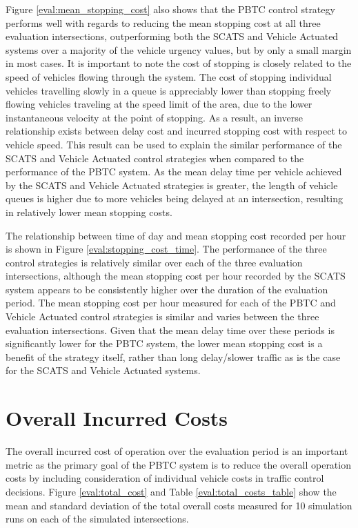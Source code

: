 Figure \ref{eval:mean_stopping_cost} also shows that the PBTC control strategy performs well with regards to reducing the mean stopping cost at all three evaluation intersections, outperforming both the SCATS and Vehicle Actuated systems over a majority of the vehicle urgency values, but by only a small margin in most cases. It is important to note the cost of stopping is closely related to the speed of vehicles flowing through the system. The cost of stopping individual vehicles travelling slowly in a queue is appreciably lower than stopping freely flowing vehicles traveling at the speed limit of the area, due to the lower instantaneous velocity at the point of stopping. As a result, an inverse relationship exists between delay cost and incurred stopping cost with respect to vehicle speed. This result can be used to explain the similar performance of the SCATS and Vehicle Actuated control strategies when compared to the performance of the PBTC system. As the mean delay time per vehicle achieved by the SCATS and Vehicle Actuated strategies is greater, the length of vehicle queues is higher due to more vehicles being delayed at an intersection, resulting in relatively lower mean stopping costs.

The relationship between time of day and mean stopping cost recorded per hour is shown in Figure \ref{eval:stopping_cost_time}. The performance of the three control strategies is relatively similar over each of the three evaluation intersections, although the mean stopping cost per hour recorded by the SCATS system appears to be consistently higher over the duration of the evaluation period. The mean stopping cost per hour measured for each of the PBTC and Vehicle Actuated control strategies is similar and varies between the three evaluation intersections. Given that the mean delay time over these periods is significantly lower for the PBTC system, the lower mean stopping cost is a benefit of the strategy itself, rather than long delay/slower traffic as is the case for the SCATS and Vehicle Actuated systems.

\section{Overall Incurred Costs}

The overall incurred cost of operation over the evaluation period is an important metric as the primary goal of the PBTC system is to reduce the overall operation costs by including consideration of individual vehicle costs in traffic control  decisions. Figure \ref{eval:total_cost} and Table \ref{eval:total_costs_table} show the mean and standard deviation of the total overall costs measured for 10 simulation runs on each of the simulated intersections.

